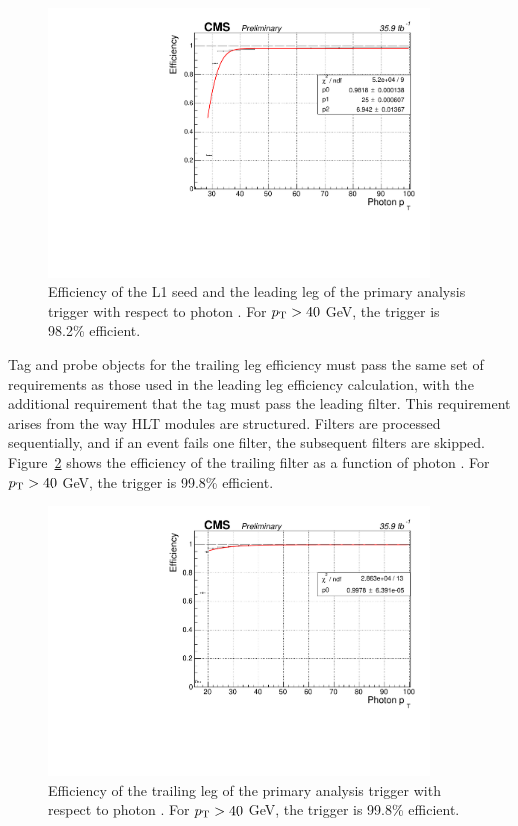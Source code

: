 \begin{figure}[h]
\begin{center}
\includegraphics[width=0.9\textwidth]{Figures/Trigger/leadingEff.pdf}
\end{center}
\caption{Efficiency of the L1 seed and the leading leg of the primary analysis trigger with respect to photon \pT. 
For $p_{\mathrm{T}} > 40$ GeV, the trigger is 98.2\% efficient.}
\label{fig:leadEff}
\end{figure}

Tag and probe objects for the trailing leg efficiency must pass the same set of requirements as those used in the leading leg efficiency calculation, with the additional requirement that the tag must pass the leading filter. This requirement arises from the way HLT modules are structured. Filters are processed sequentially, and if an event fails one filter, the subsequent filters are skipped. Figure~\ref{fig:trailEff} shows the efficiency of the trailing filter as a function of photon \pt. For $p_{\mathrm{T}} > 40$ GeV, the trigger is 99.8\% efficient.

\begin{figure}[h]
\begin{center}
\includegraphics[width=0.9\textwidth]{Figures/Trigger/trailingEff.pdf}
\end{center}
\caption{Efficiency of the trailing leg of the primary analysis trigger with respect to photon \pT. 
For $p_{\mathrm{T}} > 40$ GeV, the trigger is 99.8\% efficient.}
\label{fig:trailEff}
\end{figure}

